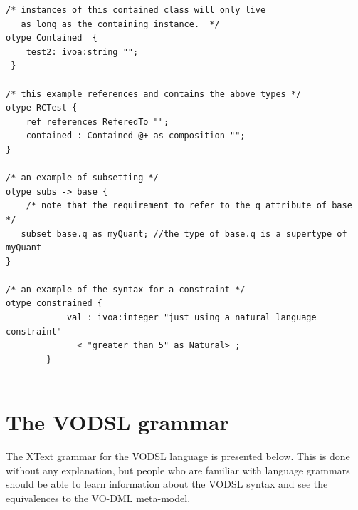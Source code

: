 \documentclass[11pt,a4paper]{ivoa}
\begin{document}
\begin{lstlisting}[language=vodsl]
/* instances of this contained class will only live
   as long as the containing instance.  */
otype Contained  {
 	test2: ivoa:string "";
 }
 
/* this example references and contains the above types */
otype RCTest { 
	ref references ReferedTo "";
	contained : Contained @+ as composition "";
}

/* an example of subsetting */
otype subs -> base {
	/* note that the requirement to refer to the q attribute of base */
   subset base.q as myQuant; //the type of base.q is a supertype of myQuant
}

/* an example of the syntax for a constraint */
otype constrained {
			val : ivoa:integer "just using a natural language constraint" 
			  < "greater than 5" as Natural> ;
		}


\end{lstlisting}


\section{The VODSL grammar}
\label{sec:grammar}
The XText grammar for the VODSL language is presented below. This is done without any explanation, but people who are familiar with language grammars should
be able to learn information about the VODSL syntax and see the equivalences to the VO-DML meta-model.





\end{document}
